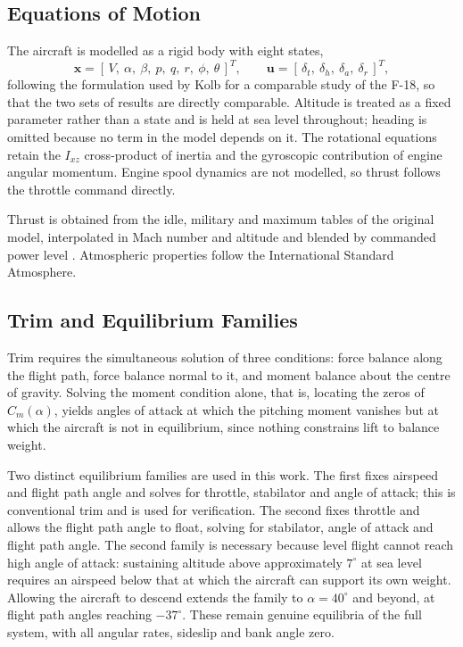 \documentclass[
bindingoffset=5mm,  %
footnoteindent=3mm, %
hyphenation=true    %
]{src/wut-thesis}
\begin{document}
 \subsection{Equations of Motion}
 
 The aircraft is modelled as a rigid body with eight states,
 \begin{equation}
 	\mathbf{x} = \left[\,V,\ \alpha,\ \beta,\ p,\ q,\ r,\ \phi,\ \theta\,\right]^{T},
 	\qquad
 	\mathbf{u} = \left[\,\delta_{t},\ \delta_{h},\ \delta_{a},\ \delta_{r}\,\right]^{T},
 	\label{eq:states}
 \end{equation}
 following the formulation used by Kolb \cite{kolb2017} for a comparable study
 of the F-18, so that the two sets of results are directly comparable.
 Altitude is treated as a fixed parameter rather than a state and is held at
 sea level throughout; heading is omitted because no term in the model depends
 on it. The rotational equations retain the $I_{xz}$ cross-product of inertia
 and the gyroscopic contribution of engine angular momentum. Engine spool
 dynamics are not modelled, so thrust follows the throttle command directly.
 
 Thrust is obtained from the idle, military and maximum tables of the original
 model, interpolated in Mach number and altitude and blended by commanded
 power level \cite{nguyen1979,stevenslewis}. Atmospheric properties follow the
 International Standard Atmosphere.
  
 \subsection{Trim and Equilibrium Families}
 \label{sec:families}
 Trim requires the simultaneous solution of three conditions: force balance
 along the flight path, force balance normal to it, and moment balance about
 the centre of gravity. Solving the moment condition alone, that is, locating
 the zeros of $C_{m}(\alpha)$, yields angles of attack at which the pitching
 moment vanishes but at which the aircraft is not in equilibrium, since
 nothing constrains lift to balance weight.
 
 Two distinct equilibrium families are used in this work. The first fixes
 airspeed and flight path angle and solves for throttle, stabilator and angle
 of attack; this is conventional trim and is used for verification. The second
 fixes throttle and allows the flight path angle to float, solving for
 stabilator, angle of attack and flight path angle. The second family is
 necessary because level flight cannot reach high angle of attack: sustaining
 altitude above approximately $7^{\circ}$ at sea level requires an airspeed
 below that at which the aircraft can support its own weight. Allowing the
 aircraft to descend extends the family to $\alpha = 40^{\circ}$ and beyond, at
 flight path angles reaching $-37^{\circ}$. These remain genuine equilibria of
 the full system, with all angular rates, sideslip and bank angle zero.
 
\end{document}
